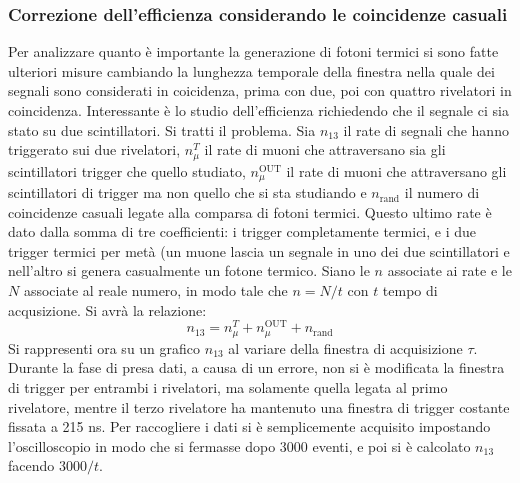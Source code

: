 \subsubsection{Correzione dell'efficienza considerando le coincidenze casuali}
Per analizzare quanto è importante la generazione di fotoni termici si sono fatte ulteriori misure cambiando la lunghezza temporale della finestra nella quale dei segnali sono considerati in coicidenza, prima con due, poi con quattro rivelatori in coincidenza.
Interessante è lo studio dell'efficienza richiedendo che il segnale ci sia stato su due scintillatori. Si tratti il problema. Sia $n_{13}$ il rate di segnali che hanno triggerato sui due rivelatori, $n_\mu^T$ il rate di muoni che attraversano sia gli scintillatori trigger che quello studiato, $n_\mu^\text{OUT}$ il rate di muoni che attraversano gli scintillatori di trigger ma non quello che si sta studiando e $n_\text{rand}$ il numero di coincidenze casuali legate alla comparsa di fotoni termici. Questo ultimo rate è dato dalla somma di tre coefficienti: i trigger completamente termici, e i due trigger termici per metà (un muone lascia un segnale in uno dei due scintillatori e nell'altro si genera casualmente un fotone termico. Siano le $n$ associate ai rate e le $N$ associate al reale numero, in modo tale che $n=N/t$ con $t$ tempo di acqusizione. Si avrà la relazione:
\begin{equation}
  n_{13} = n_\mu^T + n_\mu^\text{OUT} + n_\text{rand}
\end{equation}
Si rappresenti ora su un grafico $n_{13}$ al variare della finestra di acquisizione $\tau$. Durante la fase di presa dati, a causa di un errore, non si è modificata la finestra di trigger per entrambi i rivelatori, ma solamente quella legata al primo rivelatore, mentre il terzo rivelatore ha mantenuto una finestra di trigger costante fissata a 215 ns. Per raccogliere i dati si è semplicemente acquisito impostando l'oscilloscopio in modo
che si fermasse dopo 3000 eventi, e poi si è calcolato $n_{13}$ facendo $3000/t$. %
